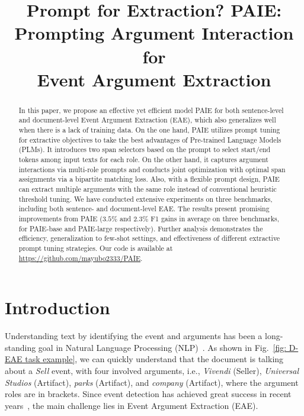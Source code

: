 \title{Prompt for Extraction? PAIE: Prompting Argument Interaction for \\ Event Argument Extraction}



\maketitle

\renewcommand{\thefootnote}{\fnsymbol{footnote}}
\renewcommand{\thefootnote}{\arabic{footnote}}

\begin{abstract}
In this paper, we propose an effective yet efficient model PAIE for both sentence-level and document-level Event Argument Extraction (EAE), which also generalizes well when there is a lack of training data. On the one hand, PAIE utilizes prompt tuning for extractive objectives to take the best advantages of Pre-trained Language Models (PLMs). It introduces two span selectors based on the prompt to select start/end tokens among input texts for each role. On the other hand, it captures argument interactions via multi-role prompts and conducts joint optimization with optimal span assignments via a bipartite matching loss. Also, with a flexible prompt design, PAIE can extract multiple arguments with the same role instead of conventional heuristic threshold tuning. We have conducted extensive experiments on three benchmarks, including both sentence- and document-level EAE. The results present promising improvements from PAIE ($3.5\%$ and $2.3\%$ F1 gains in average on three benchmarks, for PAIE-base and PAIE-large respectively). Further analysis demonstrates the efficiency, generalization to few-shot settings, and effectiveness of different extractive prompt tuning strategies. Our code is available at \url{https://github.com/mayubo2333/PAIE}.
\end{abstract}

\section{Introduction}

Understanding text by identifying the event and arguments has been a long-standing goal in Natural Language Processing (NLP)~\cite{sundheim-1992-overview}. As shown in Fig.~\ref{fig: D-EAE task example}, we can quickly understand that the document is talking about a \textit{Sell} event, with four involved arguments, i.e., \textit{Vivendi} (Seller), \textit{Universal Studios} (Artifact), \textit{parks} (Artifact), and \textit{company} (Artifact), where the argument roles are in brackets. Since event detection has achieved great success in recent years~\cite{wang-etal-2021-cleve}, the main challenge lies in Event Argument Extraction (EAE).

